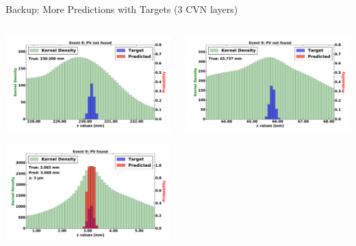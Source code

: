 \begin{frame}{Backup: More Predictions with Targets (3 CVN layers)}
  \begin{columns}[c]
        \begin{center}
            \includegraphics[width=1\textwidth,height=0.45\textwidth, trim=18 0 18 0]{images/120000_3layer_53.pdf}
    
            \includegraphics[width=1\textwidth, height=0.45\textwidth,trim=18 0 18 0]{images/120000_3layer_54.pdf}

        \end{center}
        \begin{center}
           \includegraphics[width=1\textwidth, height=0.45\textwidth, trim=18 0 18 0]{images/120000_3layer_55.pdf}
    

\end{center}
\end{columns}
\end{frame}
